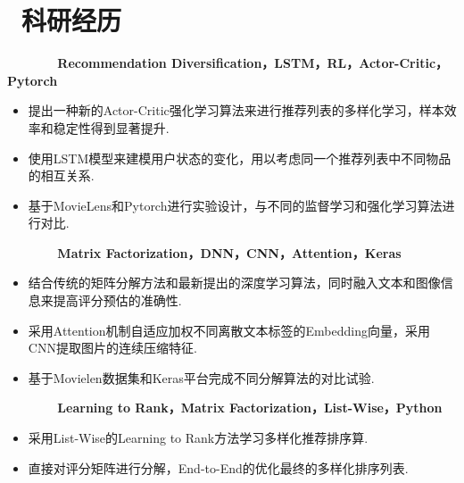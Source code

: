 \documentclass{resume}
\begin{document}
\section{\faUsers\ 科研经历}
\textbf{~~~~~~~Recommendation Diversification，LSTM，RL，Actor-Critic，Pytorch}
\begin{onehalfspacing}
	\begin{itemize}
		\item 提出一种新的Actor-Critic强化学习算法来进行推荐列表的多样化学习，样本效率和稳定性得到显著提升.
		\item 使用LSTM模型来建模用户状态的变化，用以考虑同一个推荐列表中不同物品的相互关系.
		\item 基于MovieLens和Pytorch进行实验设计，与不同的监督学习和强化学习算法进行对比.
	\end{itemize}
\end{onehalfspacing}
\textbf{~~~~~~~Matrix Factorization，DNN，CNN，Attention，Keras}
\begin{onehalfspacing}
\begin{itemize}
	\item 结合传统的矩阵分解方法和最新提出的深度学习算法，同时融入文本和图像信息来提高评分预估的准确性.
	\item 采用Attention机制自适应加权不同离散文本标签的Embedding向量，采用CNN提取图片的连续压缩特征.
	\item 基于Movielen数据集和Keras平台完成不同分解算法的对比试验.
\end{itemize}
\end{onehalfspacing}
\textbf{~~~~~~~Learning to Rank，Matrix Factorization，List-Wise，Python}
\begin{onehalfspacing}
	\begin{itemize}
		\item 采用List-Wise的Learning to Rank方法学习多样化推荐排序算.
		\item 直接对评分矩阵进行分解，End-to-End的优化最终的多样化排序列表.
	\end{itemize}
\end{onehalfspacing}
\end{document}
